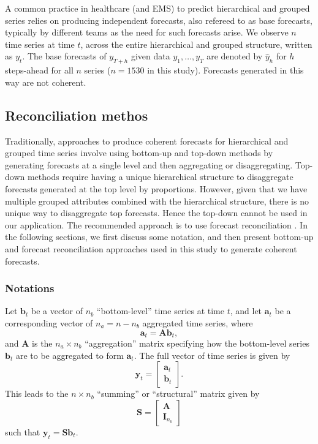 \documentclass[
  authoryear,
  preprint,
  3p]{elsarticle}
\begin{document}
A common practice in healthcare (and EMS) to predict hierarchical and
grouped series relies on producing independent forecasts, also refereed
to as base forecasts, typically by different teams as the need for such
forecasts arise. We observe \(n\) time series at time \(t\), across the
entire hierarchical and grouped structure, written as \(y_t\). The base
forecasts of \(y_{T+h}\) given data \(y_1,\dots,y_T\) are denoted by
\(\hat{y}_h\) for \(h\) steps-ahead for all \(n\) series (\(n=1530\) in
this study). Forecasts generated in this way are not coherent.

\hypertarget{reconciliation-methos}{%
\subsection{Reconciliation methos}\label{reconciliation-methos}}

Traditionally, approaches to produce coherent forecasts for hierarchical
and grouped time series involve using bottom-up and top-down methods by
generating forecasts at a single level and then aggregating or
disaggregating. Top-down methods require having a unique hierarchical
structure to disaggregate forecasts generated at the top level by
proportions. However, given that we have multiple grouped attributes
combined with the hierarchical structure, there is no unique way to
disaggregate top forecasts. Hence the top-down cannot be used in our
application. The recommended approach is to use forecast reconciliation
\citep{hyndman2011optimal}. In the following sections, we first discuss
some notation, and then present bottom-up and forecast reconciliation
approaches used in this study to generate coherent forecasts.

\hypertarget{notations}{%
\subsubsection{Notations}\label{notations}}

Let \(\bm{b}_t\) be a vector of \(n_b\) ``bottom-level'' time series at
time \(t\), and let \(\bm{a}_t\) be a corresponding vector of
\(n_a = n-n_b\) aggregated time series, where \[
  \bm{a}_t = \bm{A}\bm{b}_t,
\] and \(\bm{A}\) is the \(n_a\times n_b\) ``aggregation'' matrix
specifying how the bottom-level series \(\bm{b}_t\) are to be aggregated
to form \(\bm{a}_t\). The full vector of time series is given by \[
 \bm{y}_t = \begin{bmatrix}\bm{a}_t \\\bm{b}_t\end{bmatrix}.
\] This leads to the \(n\times n_b\) ``summing'' or ``structural''
matrix given by \[
  \bm{S} = \begin{bmatrix}\bm{A} \\ \bm{I}_{n_b}\end{bmatrix}
\] such that \(\bm{y}_t = \bm{S}\bm{b}_t\).
\end{document}
